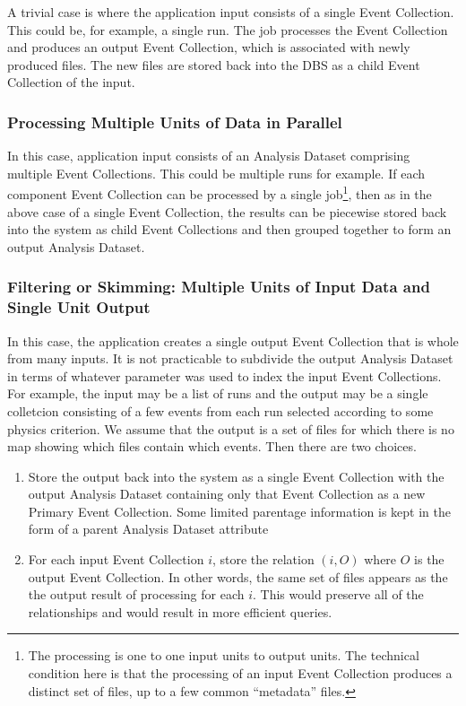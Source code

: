 \documentclass{cmspaper}
\begin{document}
A trivial case is where the application input consists of a single Event Collection. 
This could be, for example, a single run.  The job processes the Event Collection 
and produces an output Event Collection, which is associated 
with newly produced files.  The new files are stored back into the DBS as a child 
Event Collection of the input.  

\subsubsection{Processing Multiple Units of Data in Parallel}

In this case, application input consists of an Analysis Dataset
comprising multiple Event Collections. This 
could be multiple runs for example.  If each component Event Collection can be 
processed by a single job\footnote{The processing is one to one input units to output 
units.  The technical condition here is that the processing 
of an input Event Collection produces a distinct set of files, up to a few common ``metadata'' files.}, then as in the above case of a single Event Collection, the results
can be piecewise stored back into the system as child Event Collections and then grouped
together to form an output Analysis Dataset.  

\subsubsection{Filtering or Skimming: Multiple Units of Input Data and Single Unit Output}

In this case, the application creates a single output Event Collection that is whole 
from many inputs. It is not practicable to subdivide the output 
Analysis Dataset in terms of whatever parameter
was used to index the input Event Collections.  For example, the input may be 
a list of runs and the output may be a single colletcion consisting of a few 
events from each run selected according to some physics criterion.  We 
assume that the output is a set of files for which there is no map
showing which files contain which events.  Then there are two choices.
\begin{enumerate}
\item Store the output back into the system as a single Event Collection with 
the output Analysis Dataset containing only that Event Collection as a new 
Primary Event Collection.   Some limited parentage information 
is kept in the form of a parent Analysis Dataset attribute
\item For each input Event Collection $i$, store the relation $(i,O)$ where 
$O$ is the output Event Collection.  In other words, the same set of 
files appears as the the output result of processing for each $i$.  This
would preserve all of the relationships and would 
result in more efficient queries.  
\end{enumerate}
\end{document}
